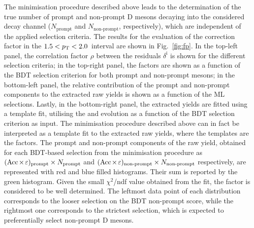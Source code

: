 The minimisation procedure described above leads to the determination of the true number of prompt and non-prompt D mesons decaying into the considered decay channel ($N_\mathrm{prompt}$ and $N_\mathrm{non\text{-}prompt}$, respectively), which are independent of the applied selection criteria. The results for the evaluation of the \ds \fp correction factor in the $1.5<p_\mathrm{T}<2.0$~\gevc interval are shown in Fig.~\ref{fig:fp}. In the top-left panel, the correlation factor $\rho$ between the residuals $\delta^\mathrm{i}$ is shown for the different selection criteria; in the top-right panel, the \aeff factors are shown as a function of the BDT selection criterion for both prompt and non-prompt \ds mesons; in the bottom-left panel, the relative contribution of the prompt and non-prompt components to the extracted \ds raw yields is shown as a function of the ML selections. Lastly, in the bottom-right panel, the extracted yields are fitted using a template fit, utilising the \aeffpds and \aeffnpds evolution as a function of the BDT selection criterion as input. The minimisation procedure described above can in fact be interpreted as a template fit to the extracted raw yields, where the templates are the \aeff factors. The prompt and non-prompt components of the raw yield, obtained for each BDT-based selection from the minimisation procedure as \mbox{$(\mathrm{Acc}\mkern-2mu\times\mkern-2mu\varepsilon)_\mathrm{prompt}\times N_\mathrm{prompt}$} and $(\mathrm{Acc}\mkern-2mu\times\mkern-2mu\varepsilon)_\mathrm{non\text{-}prompt}\times N_\mathrm{non\text{-}prompt}$ respectively, are represented with red and blue filled histograms. Their sum is reported by the green histogram. Given the small $\chi^2$/ndf value obtained from the fit, the \fp factor is considered to be well determined. The leftmost data point of each distribution corresponds to the looser selection on the BDT non-prompt score, while the rightmost one corresponds to the strictest selection, which is expected to preferentially select non-prompt D mesons. 
